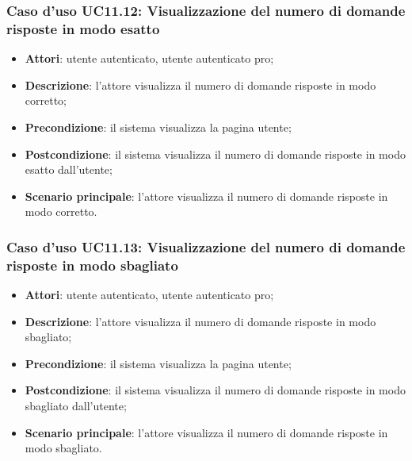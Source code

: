\subsubsection{Caso d'uso UC11.12: Visualizzazione del numero di domande risposte in modo esatto}
\begin{itemize}
	\item\textbf{Attori}: utente autenticato, utente autenticato pro;
	\item\textbf{Descrizione}: l'attore visualizza il numero di domande risposte in modo corretto;
	\item\textbf{Precondizione}: il sistema visualizza la pagina utente;
	\item\textbf{Postcondizione}: il sistema visualizza il numero di domande risposte in modo esatto dall'utente;
	\item\textbf{Scenario principale}: l'attore visualizza il numero di domande risposte in modo corretto.
\end{itemize}

\subsubsection{Caso d'uso UC11.13: Visualizzazione del numero di domande risposte in modo sbagliato }
\begin{itemize}
	\item\textbf{Attori}: utente autenticato, utente autenticato pro;
	\item\textbf{Descrizione}: l'attore visualizza il numero di domande risposte in modo sbagliato;
	\item\textbf{Precondizione}: il sistema visualizza la pagina utente;
	\item\textbf{Postcondizione}: il sistema visualizza il numero di domande risposte in modo sbagliato dall'utente;
	\item\textbf{Scenario principale}: l'attore visualizza il numero di domande risposte in modo sbagliato.
\end{itemize}